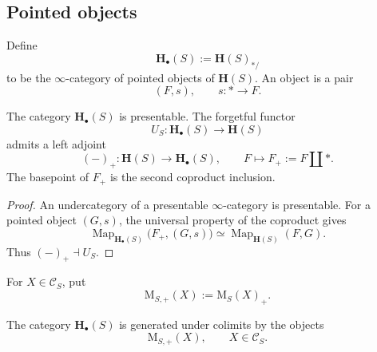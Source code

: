 \subsection{Pointed objects}

\begin{definition}
\label{def:pointed-brave-new-motivic-spaces}
Define
\[
    \mathbf H_\bullet(S)
    :=
    \mathbf H(S)_{*/}
\]
to be the \(\infty\)-category of pointed objects of
\(\mathbf H(S)\).  An object is a pair
\[
    (F,s),
    \qquad
    s
    \colon
    *
    \longrightarrow
    F.
\]
\end{definition}

\begin{proposition}
\label{prop:pointed-motivic-presentability}
The category \(\mathbf H_\bullet(S)\) is presentable.  The forgetful
functor
\[
    U_S
    \colon
    \mathbf H_\bullet(S)
    \longrightarrow
    \mathbf H(S)
\]
admits a left adjoint
\[
    (-)_+
    \colon
    \mathbf H(S)
    \longrightarrow
    \mathbf H_\bullet(S),
    \qquad
    F
    \longmapsto
    F_+:=F\amalg *.
\]
The basepoint of \(F_+\) is the second coproduct inclusion.
\end{proposition}

\begin{proof}
An undercategory of a presentable \(\infty\)-category is presentable.
For a pointed object \((G,s)\), the universal property of the coproduct
gives
\[
    \operatorname{Map}_{\mathbf H_\bullet(S)}
    \bigl(
        F_+,
        (G,s)
    \bigr)
    \simeq
    \operatorname{Map}_{\mathbf H(S)}(F,G).
\]
Thus \((-)_{+}\dashv U_S\).
\end{proof}

\begin{definition}
\label{def:pointed-smooth-motive}
For \(X\in\mathcal C_S\), put
\[
    \mathrm M_{S,+}(X)
    :=
    \mathrm M_S(X)_+.
\]
\end{definition}

\begin{proposition}
\label{prop:pointed-motivic-generation}
The category \(\mathbf H_\bullet(S)\) is generated under colimits by the
objects
\[
    \mathrm M_{S,+}(X),
    \qquad
    X\in\mathcal C_S.
\]
\end{proposition}

